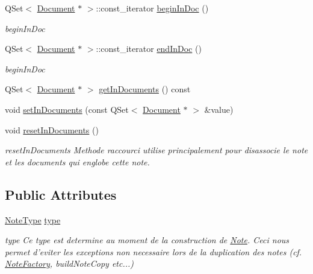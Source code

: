 \begin{DoxyCompactItemize}
\item 
Q\-Set$<$ \hyperlink{class_document}{Document} $\ast$ $>$\-::const\-\_\-iterator \hyperlink{class_note_a982785ef9c5b78e5ae6812ff85a108f9}{begin\-In\-Doc} ()
\begin{DoxyCompactList}\small\item\em begin\-In\-Doc \end{DoxyCompactList}\item 
Q\-Set$<$ \hyperlink{class_document}{Document} $\ast$ $>$\-::const\-\_\-iterator \hyperlink{class_note_a0e0b2d09fc690baec310fbcfc3422885}{end\-In\-Doc} ()
\begin{DoxyCompactList}\small\item\em begin\-In\-Doc \end{DoxyCompactList}\item 
Q\-Set$<$ \hyperlink{class_document}{Document} $\ast$ $>$ \hyperlink{class_note_a09e423efaa6e54da37e90802e52c9451}{get\-In\-Documents} () const 
\item 
void \hyperlink{class_note_a81b070504439450cef1cb77f7764ac00}{set\-In\-Documents} (const Q\-Set$<$ \hyperlink{class_document}{Document} $\ast$ $>$ \&value)
\item 
void \hyperlink{class_note_ae15164ca076da26222600fcaac8d6a1e}{reset\-In\-Documents} ()
\begin{DoxyCompactList}\small\item\em reset\-In\-Documents Methode raccourci utilise principalement pour disassocie le note et les documents qui englobe cette note. \end{DoxyCompactList}\end{DoxyCompactItemize}
\subsection*{Public Attributes}
\begin{DoxyCompactItemize}
\item 
\hyperlink{_note_factory_8h_a0e0de7dc7864c9c2e738e017dce974be}{Note\-Type} \hyperlink{class_note_a9584b201896d061ec72f48cf64dccd90}{type}
\begin{DoxyCompactList}\small\item\em type Ce type est determine au moment de la construction de \hyperlink{class_note}{Note}. Ceci nous permet d'eviter les exceptions non necessaire lors de la duplication des notes (cf. \hyperlink{class_note_factory}{Note\-Factory}, build\-Note\-Copy etc...) \end{DoxyCompactList}\end{DoxyCompactItemize}


